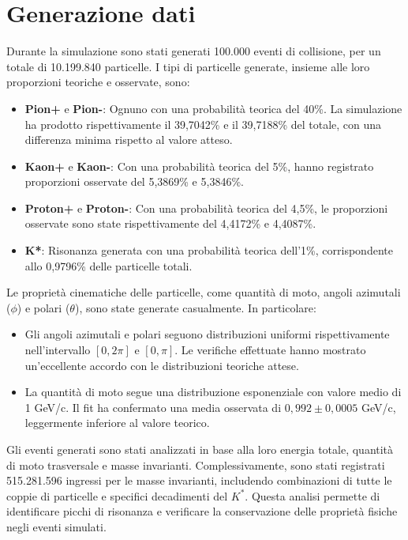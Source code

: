 \documentclass[a4paper,11pt]{article}
\begin{document}
\clearpage

\section{Generazione dati}

Durante la simulazione sono stati generati 100.000 eventi di collisione, per un totale di 10.199.840 particelle. I tipi di particelle generate, insieme alle loro proporzioni teoriche e osservate, sono:

\begin{itemize}
    \item \textbf{Pion+} e \textbf{Pion-}: Ognuno con una probabilità teorica del 40\%. La simulazione ha prodotto rispettivamente il 39,7042\% e il 39,7188\% del totale, con una differenza minima rispetto al valore atteso.
    \item \textbf{Kaon+} e \textbf{Kaon-}: Con una probabilità teorica del 5\%, hanno registrato proporzioni osservate del 5,3869\% e 5,3846\%.
    \item \textbf{Proton+} e \textbf{Proton-}: Con una probabilità teorica del 4,5\%, le proporzioni osservate sono state rispettivamente del 4,4172\% e 4,4087\%.
    \item \textbf{K*}: Risonanza generata con una probabilità teorica dell'1\%, corrispondente allo 0,9796\% delle particelle totali.
\end{itemize}

Le proprietà cinematiche delle particelle, come quantità di moto, angoli azimutali (\( \phi \)) e polari (\( \theta \)), sono state generate casualmente. In particolare:
\begin{itemize}
    \item Gli angoli azimutali e polari seguono distribuzioni uniformi rispettivamente nell'intervallo \([0, 2\pi]\) e \([0, \pi]\). Le verifiche effettuate hanno mostrato un'eccellente accordo con le distribuzioni teoriche attese.
    \item La quantità di moto segue una distribuzione esponenziale con valore medio di 1 GeV/c. Il fit ha confermato una media osservata di \(0,992 \pm 0,0005\) GeV/c, leggermente inferiore al valore teorico.
\end{itemize}

Gli eventi generati sono stati analizzati in base alla loro energia totale, quantità di moto trasversale e masse invarianti. Complessivamente, sono stati registrati 515.281.596 ingressi per le masse invarianti, includendo combinazioni di tutte le coppie di particelle e specifici decadimenti del \( K^* \). Questa analisi permette di identificare picchi di risonanza e verificare la conservazione delle proprietà fisiche negli eventi simulati.
\end{document}
